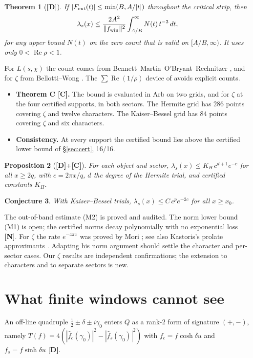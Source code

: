 \documentclass[11pt]{article}
\newtheorem{theorem}{Theorem}
\newtheorem{proposition}[theorem]{Proposition}
\newtheorem{conjecture}[theorem]{Conjecture}
\theoremstyle{remark}
\newcommand{\tagC}{\textbf{[C]}}
\newcommand{\tagD}{\textbf{[D]}}
\newcommand{\tagN}{\textbf{[N]}}
\begin{document}
\begin{theorem}[\tagD]\label{thm:bound}
If $|F_{\rm out}(t)|\le\min(B,A/|t|)$ throughout the critical strip, then
\[
\lambda_s(x)\le\frac{2A^2}{\|f_{\rm win}\|^2}\int_{A/B}^\infty N(t)\,t^{-3}\,dt,
\]
for any upper bound $N(t)$ on the zero count that is valid on $[A/B,\infty)$. It uses only $0<\operatorname{Re}\rho<1$.
\end{theorem}

For $L(s,\chi)$ the count comes from Bennett--Martin--O'Bryant--Rechnitzer \cite{bmor}, and for $\zeta$ from Bellotti--Wong \cite{bw}. The $\sum\operatorname{Re}(1/\rho)$ device of \cite{mori26a} avoids explicit counts.
\begin{itemize}
\item \textbf{Theorem C \tagC.} The bound is evaluated in Arb on two grids, and for $\zeta$ at the four certified supports, in both sectors. The Hermite grid has 286 points covering $\zeta$ and twelve characters. The Kaiser--Bessel grid has 84 points covering $\zeta$ and six characters.
\item \textbf{Consistency.} At every support the certified bound lies above the certified lower bound of \S\ref{sec:cert}, 16/16.
\end{itemize}

\begin{proposition}[\tagD+\tagC]
For each object and sector, $\lambda_s(x)\le K_H\,c^{d+1}e^{-c}$ for all $x\ge2q$, with $c=2\pi x/q$, $d$ the degree of the Hermite trial, and certified constants $K_H$.
\end{proposition}

\begin{conjecture}
With Kaiser--Bessel trials, $\lambda_s(x)\le C\,c^p e^{-2c}$ for all $x\ge x_0$.
\end{conjecture}

The out-of-band estimate (M2) is proved and audited. The norm lower bound (M1) is open; the certified norms decay polynomially with no exponential loss \tagN. For $\zeta$ the rate $e^{-4\pi x}$ was proved by Mori \cite{mori26a,mori26b}; see also Kastoris's prolate approximants \cite{kastoris26}. Adapting his norm argument should settle the character and per-sector cases. Our $\zeta$ results are independent confirmations; the extension to characters and to separate sectors is new.

\section{What finite windows cannot see}\label{sec:r1}
An off-line quadruple $\tfrac12\pm\delta\pm i\gamma_0$ enters $Q$ as a rank-2 form of signature $(+,-)$, namely $T(f)=4(|\hat f_c(\gamma_0)|^2-|\hat f_s(\gamma_0)|^2)$ with $f_c=f\cosh\delta u$ and $f_s=f\sinh\delta u$ \tagD.
\end{document}
